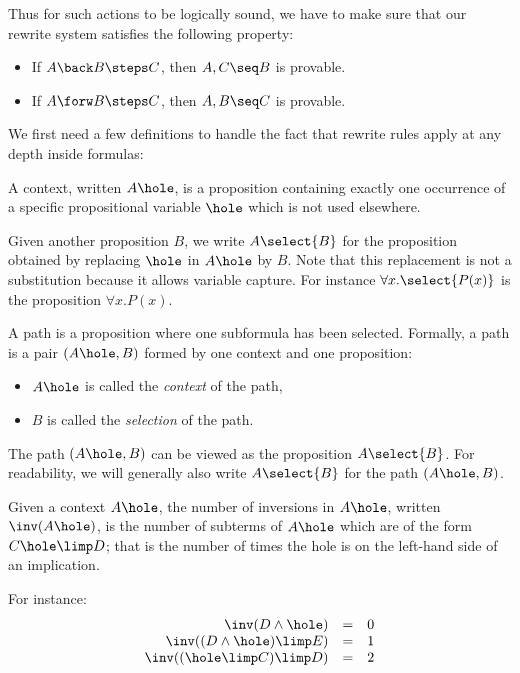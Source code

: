 Thus for such actions to be logically sound, we have to make sure that our
rewrite system satisfies the following property:

\begin{theorem}[Soundness]\label{prop:soundness}
  \phantom{a}
  \begin{itemize}
    \item If $A \back B \steps C$, then $A, C \seq B$ is provable.
    \item If $A \forw B \steps C$, then $A, B \seq C$ is provable.
  \end{itemize}
\end{theorem}

We first need a few definitions to handle the fact that rewrite rules apply at
any depth inside formulas:

\begin{definition}[Context]\label{def:context}
  A context, written $A\hole$, is a proposition containing exactly
  one occurrence of a specific propositional variable $\hole$ which is
  not used elsewhere.

  Given another proposition $B$, we write $A\select{B}$ for the
  proposition obtained by replacing $\hole$ in $A\hole$ by $B$. Note
  that this replacement is not a substitution because it allows variable
  capture. For instance $\forall x.\select{P(x)}$ is the proposition
  $\forall x.P(x)$.
\end{definition}

\begin{definition}[Path]\label{def:path}
A path is a proposition where one subformula has been
selected. Formally, a path is a pair $(A\hole, B)$ formed by one
context and one proposition:
\begin{itemize}
\item $A\hole$ is called the {\em context} of the path,
\item $B$ is called the {\em selection} of the path.
\end{itemize}

The path $(A\hole, B)$ can be viewed as the proposition
$A\select{B}$.  For readability, we will generally also write
$A\select{B}$ for the path $(A\hole, B)$.
\end{definition}

\begin{definition}[Inversions]
  Given a context $A\hole$, the number of inversions in $A\hole$,
  written $\inv(A\hole)$, is the number of subterms of $A\hole$
  which are of the form $C\hole\limp D$; that is the number of
  times the hole is on the left-hand side of an implication.
  \end{definition}
\noindent  For instance:
  $$
\begin{array}{rcl}
    \inv(D\land \hole)&=& 0\\
    \inv((D\land \hole)\limp E)&=&1\\
    \inv((\hole\limp C)\limp D) &=& 2
\end{array}
$$

